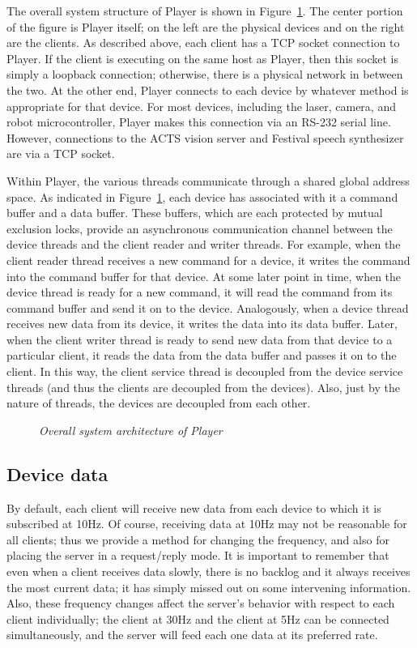 \documentclass[11pt]{report}
\begin{document}
The overall system structure of Player is shown in Figure~\ref{figure:buffers}.
The center portion of the figure is Player itself; on the left are the physical
devices and on the right are the clients.  As described above, each client
has a TCP socket connection to Player. If the client is executing on the same
host as Player, then this socket is simply a loopback connection; otherwise,
there is a physical network in between the two.  At the other end, Player
connects to each device by whatever method is appropriate for that device.
For most devices, including the laser, camera, and robot microcontroller,
Player makes this connection via an RS-232 serial line.  However, connections
to the ACTS vision server and Festival speech synthesizer are via a TCP socket.

Within Player, the various threads communicate through a shared global
address space.  As indicated in Figure~\ref{figure:buffers}, each
device has associated with it a command buffer and a data buffer.
These buffers, which are each protected by mutual exclusion locks,
provide an asynchronous communication channel between the device
threads and the client reader and writer threads.  For example, when
the client reader thread receives a new command for a device,
it writes the command into the command buffer for that device.  At
some later point in time, when the device thread is ready for a new
command, it will read the command from its command buffer and send
it on to the device.  Analogously, when a device thread receives
new data from its device, it writes the data into its data
buffer.  Later, when the client writer thread is ready to send new
data from that device to a particular client, it reads the data from the data
buffer and passes it on to the client.  In this way, the client
service thread is decoupled from the device service threads (and
thus the clients are decoupled from the devices).  Also, just by the
nature of threads, the devices are decoupled from each other.

\begin{figure}[t]
 \centering
  \caption{{\em Overall system architecture of Player}}
  \label{figure:buffers}
\end{figure} 

\subsection{Device data}
By default, each client will receive new data from each device to which it is
subscribed at 10Hz.  Of course, receiving data at 10Hz may not be reasonable
for all clients; thus we provide a method for changing the frequency, and
also for placing the server in a request/reply mode.  It is important to
remember that even when a client receives data slowly, there is no backlog
and it always receives the most current data; it has simply missed out on
some intervening information.  Also, these frequency changes affect the
server's behavior with respect to each client individually; the client at
30Hz and the client at 5Hz can be connected simultaneously, and the server
will feed each one data at its preferred rate.
\end{document}
